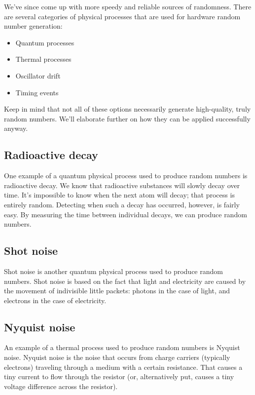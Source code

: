 \documentclass[11pt,ebook,table,dvipsnames]{memoir}
\begin{document}
We've since come up with more speedy and reliable sources of
randomness. There are several categories of physical processes that
are used for hardware random number generation:

\begin{itemize}
\item Quantum processes
\item Thermal processes
\item Oscillator drift
\item Timing events
\end{itemize}

Keep in mind that not all of these options necessarily generate
high-quality, truly random numbers. We'll elaborate further on how
they can be applied successfully anyway.

\subsection{Radioactive decay}
\label{sec-2-10-2-1}

One example of a quantum physical process used to produce random
numbers is radioactive decay. We know that radioactive substances will
slowly decay over time. It's impossible to know when the next atom
will decay; that process is entirely random. Detecting when such a
decay has occurred, however, is fairly easy. By measuring the time
between individual decays, we can produce random numbers.
\subsection{Shot noise}
\label{sec-2-10-2-2}

Shot noise is another quantum physical process used to produce random
numbers. Shot noise is based on the fact that light and electricity
are caused by the movement of indivisible little packets: photons in
the case of light, and electrons in the case of electricity.
\subsection{Nyquist noise}
\label{sec-2-10-2-3}

An example of a thermal process used to produce random numbers is
Nyquist noise. Nyquist noise is the noise that occurs from charge
carriers (typically electrons) traveling through a medium with a
certain resistance. That causes a tiny current to flow through the
resistor (or, alternatively put, causes a tiny voltage difference
across the resistor).
\end{document}
